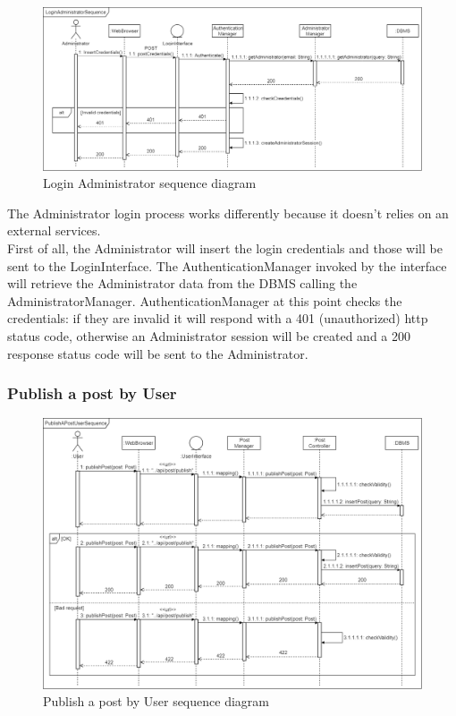 \begin{figure}[h!]
        \centering
        \includegraphics[scale=0.30]{images/runtime_view/login_administrator_runtime_view_diagram.png}
        \caption{Login Administrator sequence diagram}
        \label{fig:login_administrator_sequence_diagram}
\end{figure}
\FloatBarrier

The Administrator login process works differently because it doesn't relies on an external services.\\
First of all, the Administrator will insert the login credentials and those will be sent to the LoginInterface. The AuthenticationManager invoked by the interface will retrieve the Administrator data from the DBMS calling the AdministratorManager. AuthenticationManager at this point checks the credentials: if they are invalid it will respond with a 401 (unauthorized) http status code, otherwise an Administrator session will be created and a 200 response status code will be sent to the Administrator.

\newpage
\subsubsection{Publish a post by User}

\begin{figure}[h!]
        \centering
        \includegraphics[scale=0.30]{images/runtime_view/publish_post_user_runtime_view_diagram.png}
        \caption{Publish a post by User sequence diagram}
        \label{fig:publish_a_post_by_user_sequence_diagram}
\end{figure}
\FloatBarrier

